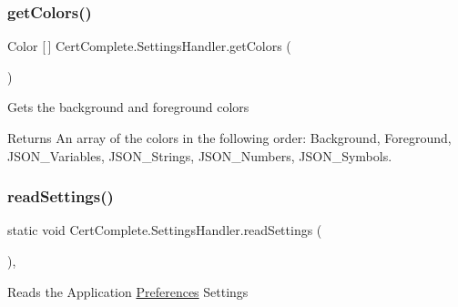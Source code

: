 \subsubsection{\texorpdfstring{get\+Colors()}{getColors()}}
{\footnotesize\ttfamily Color \mbox{[}$\,$\mbox{]} Cert\+Complete.\+Settings\+Handler.\+get\+Colors (\begin{DoxyParamCaption}{ }\end{DoxyParamCaption})\hspace{0.3cm}{\ttfamily [inline]}}



Gets the background and foreground colors 

\begin{DoxyReturn}{Returns}
An array of the colors in the following order\+: Background, Foreground, J\+S\+O\+N\+\_\+\+Variables, J\+S\+O\+N\+\_\+\+Strings, J\+S\+O\+N\+\_\+\+Numbers, J\+S\+O\+N\+\_\+\+Symbols.
\end{DoxyReturn}
\mbox{\label{class_cert_complete_1_1_settings_handler_add6b4bc1381202fdcb0bc8c1b4af65cc}} 
\subsubsection{\texorpdfstring{read\+Settings()}{readSettings()}}
{\footnotesize\ttfamily static void Cert\+Complete.\+Settings\+Handler.\+read\+Settings (\begin{DoxyParamCaption}{ }\end{DoxyParamCaption})\hspace{0.3cm}{\ttfamily [inline]}, {\ttfamily [static]}}



Reads the Application \mbox{\hyperlink{class_cert_complete_1_1_preferences}{Preferences}} Settings 

\mbox{\label{class_cert_complete_1_1_settings_handler_acd1a07ef04d7ed341a0b30e68ed83371}} 
